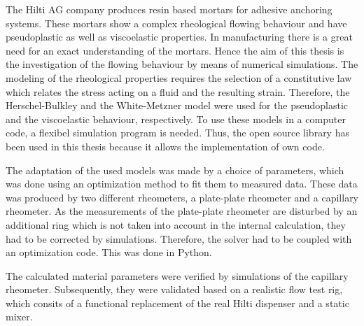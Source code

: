 \begin{abstr}
The Hilti AG company produces resin based mortars for adhesive anchoring systems.
These mortars show a complex rheological flowing behaviour and have pseudoplastic as well as viscoelastic properties.
In manufacturing there is a great need for an exact understanding of the mortars. Hence the aim of this thesis is the investigation of the flowing behaviour by means of numerical simulations.
The modeling of the rheological properties requires the selection of a constitutive law which relates the stress acting on a fluid and the resulting strain. Therefore, the Herschel-Bulkley and the White-Metzner model were used for the pseudoplastic and the viscoelastic behaviour, respectively.
To use these models in a computer code, a flexibel simulation program is needed. Thus, the open source library \openfoam{} has been used in this thesis because it allows the implementation of own code.

The adaptation of the used models was made by a choice of parameters, which was done using an optimization method to fit them to measured data.
These data was produced by two different rheometers, a plate-plate rheometer and a capillary rheometer. As the measurements of the plate-plate rheometer are disturbed by an additional ring which is not taken into account in the internal calculation, they had to be corrected by simulations.
Therefore, the solver had to be coupled with an optimization code. This was done in Python.

The calculated material parameters were verified by simulations of the capillary rheometer. Subsequently, they were validated based on a realistic flow test rig, which consits of a functional replacement of the real Hilti dispenser and a static mixer.
\end{abstr}
%
